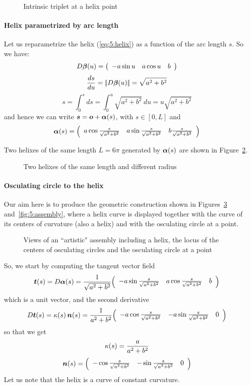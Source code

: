 \documentclass{31x47jw}
\begin{document}
\begin{figure}[ptb]
\centering{}
\caption{Intrinsic triplet at a helix point
\label{fig:5:intrinsic}}
\end{figure}

\paragraph{Helix parametrized by arc length}

Let us reparametrize the helix (\ref{eq:5:helix}) as a function of
the arc length $s$.  So we have:
\[
D{\mbox{\boldmath $\beta$}}(u) = {\left(\begin{array}{cccccccc}-a\sin u & a\cos u  &b \end{array}\right)}
\]
\[
{{d s \over d u}} = {\left|\!\left|D{\mbox{\boldmath $\beta$}}(u)\right|\!\right|} = \sqrt{a^2 + b^2}
\]
\[
s = \int_0^s ds  = \int_0^u \sqrt{a^2 + b^2}\ du = u \sqrt{a^2 + b^2}
\]
and hence we can write ${\mbox{\boldmath $s$}} = {\mbox{\boldmath $o$}}+{\mbox{\boldmath $\alpha$}}(s)$, with $s\in [0,
L]$ and \def\aa{{s\over\sqrt{a^2 + b^2}}}
\[
\v{\alpha}(s) = \vet{a\cos\aa & a\sin\aa  &b \aa }
\]

Two helixes of the same length $L=6\pi$ generated by ${\mbox{\boldmath $\alpha$}}(s)$ 
are shown in Figure~\ref{fig:5:eqhelixs}.
\begin{figure}[h]
\centering{}
\caption{Two helixes of the same length and different radius
\label{fig:5:eqhelixs}}
\end{figure}


\paragraph{Osculating circle to the helix}

Our aim here is to produce the geometric construction shown in
Figures~\ref{fig:5:helix} and~\ref{fig:5:assembly}, where a helix
curve is displayed together with the curve of its centers of
curvature (also a helix) and with the osculating circle at a point.

\begin{figure}[h]
\centering{}
\caption{Views of an ``artistic" assembly including a helix, the
locus of the centers of osculating circles and the osculating circle
at a point
\label{fig:5:helix}}
\end{figure}

So, we start by computing the tangent vector field
\def\aa{{s\over\sqrt{a^2 + b^2}}}
\begin{eqnarray*}
\v{t}(s) = D\v{\alpha}(s) = {1\over\sqrt{a^2 + b^2}}
\vet{-a\sin\aa & a\cos\aa &b }
\end{eqnarray*}
which is a unit vector, and the second derivative
\begin{eqnarray*}
D\v{t}(s) = \kappa(s)\,\v{n}(s) = {1\over{a^2 + b^2}} \vet{-a\cos\aa
& -a\sin\aa & 0 }
\end{eqnarray*}
so that we get
\[
\kappa(s) = {a\over{a^2 + b^2}}
\]
\[
\v{n}(s) = \vet{-\cos\aa & -\sin\aa  & 0 }
\]
Let us note that the helix is a curve of constant curvature.
\end{document}

